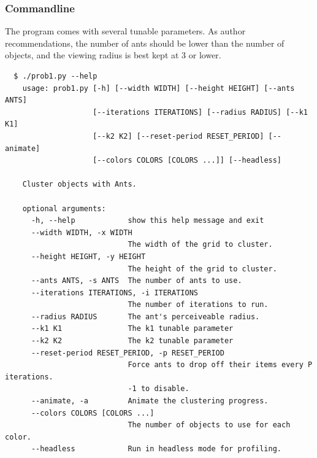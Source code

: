 \documentclass[12pt]{article}
\begin{document}
\subsubsection{Commandline}

The program comes with several tunable parameters.
As author recommendations, the number of ants should be lower than the number of objects, and the viewing radius is best kept at 3 or lower.

\begin{verbatim}
  $ ./prob1.py --help
    usage: prob1.py [-h] [--width WIDTH] [--height HEIGHT] [--ants ANTS]
                    [--iterations ITERATIONS] [--radius RADIUS] [--k1 K1]
                    [--k2 K2] [--reset-period RESET_PERIOD] [--animate]
                    [--colors COLORS [COLORS ...]] [--headless]

    Cluster objects with Ants.

    optional arguments:
      -h, --help            show this help message and exit
      --width WIDTH, -x WIDTH
                            The width of the grid to cluster.
      --height HEIGHT, -y HEIGHT
                            The height of the grid to cluster.
      --ants ANTS, -s ANTS  The number of ants to use.
      --iterations ITERATIONS, -i ITERATIONS
                            The number of iterations to run.
      --radius RADIUS       The ant's perceiveable radius.
      --k1 K1               The k1 tunable parameter
      --k2 K2               The k2 tunable parameter
      --reset-period RESET_PERIOD, -p RESET_PERIOD
                            Force ants to drop off their items every P iterations.
                            -1 to disable.
      --animate, -a         Animate the clustering progress.
      --colors COLORS [COLORS ...]
                            The number of objects to use for each color.
      --headless            Run in headless mode for profiling.
\end{verbatim}
\end{document}

